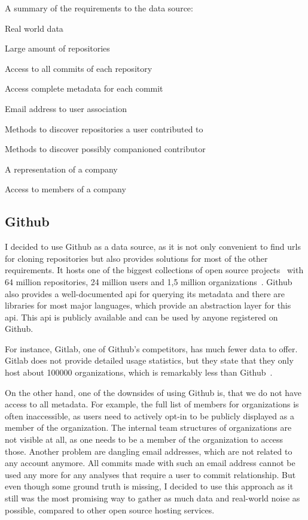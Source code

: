 \begin{itemlist}{A summary of the requirements to the data source:}
    \item Real world data
    \item Large amount of repositories
    \item Access to all commits of each repository
    \item Access complete metadata for each commit
    \item Email address to user association
    \item Methods to discover repositories a user contributed to
    \item Methods to discover possibly companioned contributor
    \item A representation of a company
    \item Access to members of a company
\end{itemlist}


\subsection{Github}\label{github}
I decided to use Github as a data source, as it is not only convenient to find \acp{url} for cloning repositories but also provides solutions for most of the other requirements.
It hosts one of the biggest collections of open source projects~\cite{techreport:how-github-conquered} with 64 million repositories, 24 million users and 1,5 million organizations~\cite{article:github-statistics}.
Github also provides a well-documented \ac{api} for querying its metadata and there are libraries for most major languages, which provide an abstraction layer for this \ac{api}.
This \ac{api} is publicly available and can be used by anyone registered on Github.

For instance, Gitlab, one of Github's competitors, has much fewer data to offer.
Gitlab does not provide detailed usage statistics, but they state that they only host about 100000 organizations, which is remarkably less than Github~\cite{article:gitlab-help}.

On the other hand, one of the downsides of using Github is, that we do not have access to all metadata.
For example, the full list of members for organizations is often inaccessible, as users need to actively opt-in to be publicly displayed as a member of the organization.
The internal team structures of organizations are not visible at all, as one needs to be a member of the organization to access those.
Another problem are dangling email addresses, which are not related to any account anymore.
All commits made with such an email address cannot be used any more for any analyses that require a user to commit relationship.
But even though some ground truth is missing, I decided to use this approach as it still was the most promising way to gather as much data and real-world noise as possible, compared to other open source hosting services.

